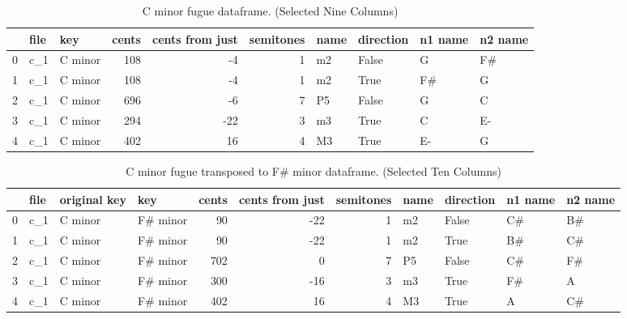 \begin{singlespace}
\begin{table}[H]
\centering
\tiny
\begin{tabular}{|lllrrrllll|}
\hline
\textbf{{}} & \textbf{file} & \textbf{     key} & \textbf{ cents} & \textbf{ cents from just} & \textbf{ semitones} & \textbf{name} & \textbf{direction} & \textbf{n1 name} & \textbf{n2 name }\\
\hline
0 &  c\_1 &  C minor &    108 &               -4 &          1 &   m2 &     False &       G &      F\# \\
1 &  c\_1 &  C minor &    108 &               -4 &          1 &   m2 &      True &      F\# &       G \\
2 &  c\_1 &  C minor &    696 &               -6 &          7 &   P5 &     False &       G &       C \\
3 &  c\_1 &  C minor &    294 &              -22 &          3 &   m3 &      True &       C &      E- \\
4 &  c\_1 &  C minor &    402 &               16 &          4 &   M3 &      True &      E- &       G \\
\hline
\end{tabular}
\caption{C minor fugue dataframe. (Selected Nine Columns) }
\end{table}
\normalsize
\end{singlespace}
\begin{singlespace}
\begin{table}[H]
\centering
\tiny
\begin{tabular}{|llllrrrllll|}
\hline
\textbf{{}} & \textbf{file} & \textbf{original key} & \textbf{      key} & \textbf{ cents} & \textbf{ cents from just} & \textbf{ semitones} & \textbf{name} & \textbf{direction} & \textbf{n1 name} & \textbf{n2 name }\\
\hline
0 &  c\_1 &      C minor &  F\# minor &     90 &              -22 &          1 &   m2 &     False &      C\# &      B\# \\
1 &  c\_1 &      C minor &  F\# minor &     90 &              -22 &          1 &   m2 &      True &      B\# &      C\# \\
2 &  c\_1 &      C minor &  F\# minor &    702 &                0 &          7 &   P5 &     False &      C\# &      F\# \\
3 &  c\_1 &      C minor &  F\# minor &    300 &              -16 &          3 &   m3 &      True &      F\# &       A \\
4 &  c\_1 &      C minor &  F\# minor &    402 &               16 &          4 &   M3 &      True &       A &      C\# \\
\hline
\end{tabular}
\caption{C minor fugue transposed to F\# minor dataframe. (Selected Ten Columns) }
\end{table}
\normalsize
\end{singlespace}


